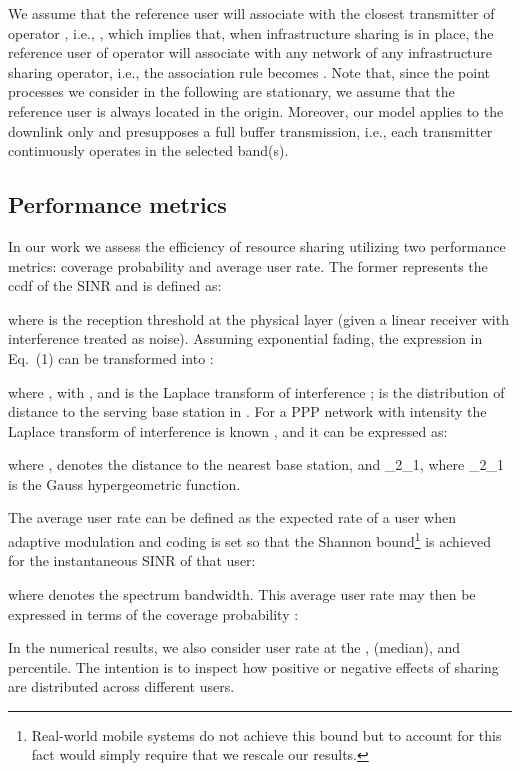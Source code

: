 \documentclass[12pt, journal,doublecolumn, final]{IEEEtran}
\begin{document}
We assume that the reference user will associate with the closest transmitter of operator , i.e., , which implies that, when infrastructure sharing is in place, the reference user of operator  will associate with any network of any infrastructure sharing operator, i.e., the association rule becomes . Note that, since the point processes we consider in the following are stationary, we assume that the reference user is always located in the origin. Moreover, our model applies to the downlink only and presupposes a full buffer transmission, i.e., each transmitter continuously operates in the selected band(s).

\subsection{Performance metrics}

In our work we assess the efficiency of resource sharing utilizing two performance metrics: coverage probability and average user rate. The former represents the \ac{ccdf} of the \ac{SINR} and is defined as:

where  is the reception threshold at the physical layer (given a linear receiver with interference treated as noise). Assuming exponential fading, the expression in Eq.~(1) can be transformed into \cite{AndrewsBaccelliGanti_2011}:

where ,  with , and  is the Laplace transform of interference ;  is the distribution of distance to the serving base station in . For a \ac{PPP} network  with intensity  the Laplace transform of interference is known \cite{AndrewsBaccelliGanti_2011}, and it can be expressed as:

where ,  denotes the distance to the nearest base station, and _2_1, where _2_1 is the Gauss hypergeometric function.

The average user rate can be defined as the expected rate of a user when adaptive modulation and coding is set so that the Shannon bound\footnote{Real-world mobile systems do not achieve this bound but to account for this fact would simply require that we rescale our results.} is achieved for the instantaneous \ac{SINR} of that user:

where  denotes the spectrum bandwidth. This average user rate may then be expressed in terms of the coverage probability \cite{AndrewsBaccelliGanti_2011}:

In the numerical results, we also consider user rate at the ,  (median), and  percentile. The intention is to inspect how positive or negative effects of sharing are distributed across different users.
\end{document}
